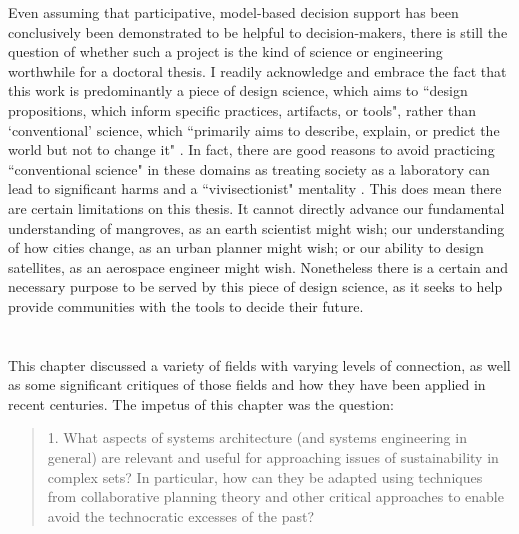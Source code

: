 Even assuming that participative, model-based decision support has been conclusively been demonstrated to be helpful to decision-makers, there is still the question of whether such a project is the kind of science or engineering worthwhile for a doctoral thesis. I readily acknowledge and embrace the fact that this work is predominantly a piece of design science, which aims to ``design propositions, which inform specific practices, artifacts, or tools", rather than `conventional' science, which ``primarily aims to describe, explain, or predict the world but not to change it" \cite{goodspeedScenarioPlanningCities2020}. In fact, there are good reasons to avoid practicing ``conventional science" in these domains as treating society as a laboratory can lead to significant harms and a ``vivisectionist" mentality \cite{banandynuriModernMedicineIts1990}. This does mean there are certain limitations on this thesis. It cannot directly advance our fundamental understanding of mangroves, as an earth scientist might wish; our understanding of how cities change, as an urban planner might wish; or our ability to design satellites, as an aerospace engineer might wish. Nonetheless there is a certain and necessary purpose to be served by this piece of design science, as it seeks to help provide communities with the tools to decide their future.






\section{} \label{sec:chap2-conc}

This chapter discussed a variety of fields with varying levels of connection, as well as some significant critiques of those fields and how they have been applied in recent centuries. The impetus of this chapter was the question:

\blockquote{ 1. What aspects of systems architecture (and systems engineering in general) are relevant and useful for approaching issues of sustainability in complex \acf{sets}? In particular, how can they be adapted using techniques from collaborative planning theory and other critical approaches to enable avoid the technocratic excesses of the past?}

